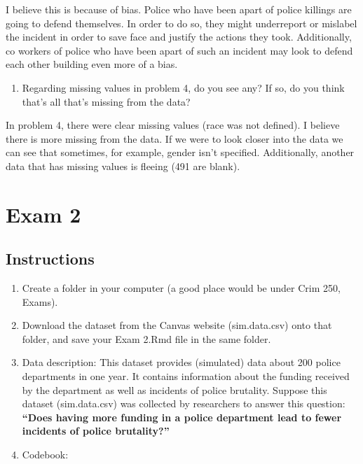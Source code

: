 \documentclass[
]{article}
\providecommand{\tightlist}{%
  \setlength{\itemsep}{0pt}\setlength{\parskip}{0pt}}
\begin{document}
I believe this is because of bias. Police who have been apart of police
killings are going to defend themselves. In order to do so, they might
underreport or mislabel the incident in order to save face and justify
the actions they took. Additionally, co workers of police who have been
apart of such an incident may look to defend each other building even
more of a bias.

\begin{enumerate}
\def\labelenumi{\alph{enumi}.}
\setcounter{enumi}{2}
\tightlist
\item
  Regarding missing values in problem 4, do you see any? If so, do you
  think that's all that's missing from the data?
\end{enumerate}

In problem 4, there were clear missing values (race was not defined). I
believe there is more missing from the data. If we were to look closer
into the data we can see that sometimes, for example, gender isn't
specified. Additionally, another data that has missing values is fleeing
(491 are blank).

\hypertarget{exam-2}{%
\section{Exam 2}\label{exam-2}}

\hypertarget{instructions-1}{%
\subsection{Instructions}\label{instructions-1}}

\begin{enumerate}
\def\labelenumi{\alph{enumi}.}
\item
  Create a folder in your computer (a good place would be under Crim
  250, Exams).
\item
  Download the dataset from the Canvas website (sim.data.csv) onto that
  folder, and save your Exam 2.Rmd file in the same folder.
\item
  Data description: This dataset provides (simulated) data about 200
  police departments in one year. It contains information about the
  funding received by the department as well as incidents of police
  brutality. Suppose this dataset (sim.data.csv) was collected by
  researchers to answer this question: \textbf{``Does having more
  funding in a police department lead to fewer incidents of police
  brutality?''}
\item
  Codebook:
\end{enumerate}
\end{document}

